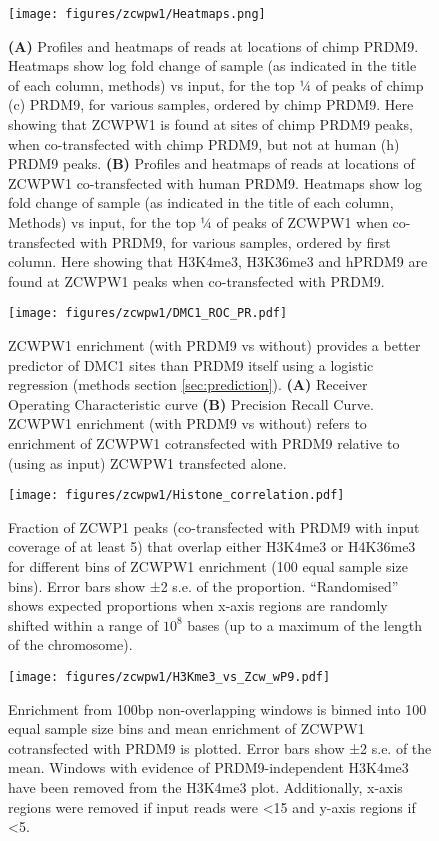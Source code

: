 \begin{figure}[H]
	\centering
	\texttt{[image: figures/zcwpw1/Heatmaps.png]}
	\caption[Zcwpw1 Heatmaps]{
		\textbf{(A)} Profiles and heatmaps of reads at locations of chimp PRDM9.
			Heatmaps show log fold change of sample (as indicated in the title of each column, methods) vs input, for the top ¼ of peaks of chimp (c) PRDM9, for various samples, ordered by chimp PRDM9.
			Here showing that ZCWPW1 is found at sites of chimp PRDM9 peaks, when co-transfected with chimp PRDM9, but not at human (h) PRDM9 peaks.
		\textbf{(B)} Profiles and heatmaps of reads at locations of ZCWPW1 co-transfected with human PRDM9.
			Heatmaps show log fold change of sample (as indicated in the title of each column, Methods) vs input, for the top ¼ of peaks of ZCWPW1 when co-transfected with PRDM9, for various samples, ordered by first column.
			Here showing that H3K4me3, H3K36me3 and hPRDM9 are found at ZCWPW1 peaks when co-transfected with PRDM9.
	}
	\label{fig:Heatmaps}
\end{figure}


\begin{figure}[H]
	\centering
	\texttt{[image: figures/zcwpw1/DMC1\_ROC\_PR.pdf]}
	\caption[DMC1 prediction]{
		ZCWPW1 enrichment (with PRDM9 vs without) provides a better predictor of DMC1 sites than PRDM9 itself using a logistic regression (methods section \ref{sec:prediction}).
		\textbf{(A)} Receiver Operating Characteristic curve
		\textbf{(B)} Precision Recall Curve.
			ZCWPW1 enrichment (with PRDM9 vs without) refers to enrichment of ZCWPW1 cotransfected with PRDM9 relative to (using as input) ZCWPW1 transfected alone.
	}
	\label{fig:ROC}
\end{figure}


\begin{figure}[H]
	\centering
	\texttt{[image: figures/zcwpw1/Histone\_correlation.pdf]}
	\caption[Histone Correlation from peaks]{
		Fraction of ZCWP1 peaks (co-transfected with PRDM9 with input coverage of at least 5) that overlap either H3K4me3 or H4K36me3 for different bins of ZCWPW1 enrichment (100 equal sample size bins).
		Error bars show ±2 s.e. of the proportion.
		``Randomised'' shows expected proportions when x-axis regions are randomly shifted within a range of $10^8$ bases (up to a maximum of the length of the chromosome).
	}
	\label{fig:histone_corr}
\end{figure}


\begin{figure}[H]
	\centering
	\texttt{[image: figures/zcwpw1/H3Kme3\_vs\_Zcw\_wP9.pdf]}
	\caption[Histone Correlation from windows]{
		Enrichment from 100bp non-overlapping windows is binned into 100 equal sample size bins and mean enrichment of ZCWPW1 cotransfected with PRDM9 is plotted.
		Error bars show ±2 s.e. of the mean.
		Windows with evidence of PRDM9-independent H3K4me3 have been removed from the H3K4me3 plot.
		Additionally, x-axis regions were removed if input reads were <15 and y-axis regions if <5.
	}
	\label{fig:histone_corr2}
\end{figure}



